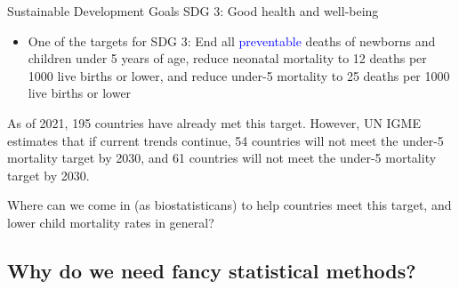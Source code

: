 \documentclass[10pt,t]{beamer}
\begin{document}
\begin{frame}{Sustainable Development Goals}
SDG 3: Good health and well-being

\vspace{0.3cm}

\begin{itemize}
	\item One of the targets for SDG 3: End all \textcolor{blue}{preventable} deaths of newborns and children under 5 years of age, reduce neonatal mortality to 12 deaths per 1000 live births or lower, and reduce under-5 mortality to 25 deaths per 1000 live births or lower 
\end{itemize}

\vspace{0.3cm}

\pause As of 2021, 195 countries have already met this target. However, UN IGME estimates that if current trends continue, 54 countries will not meet the under-5 mortality target by 2030, and 61 countries will not meet the under-5 mortality target by 2030.

\vspace{0.3cm}

\pause Where can we come in (as biostatisticans) to help countries meet this target, and lower child mortality rates in general?
\end{frame}

\subsection{Why do we need fancy statistical methods?}
\end{document}
